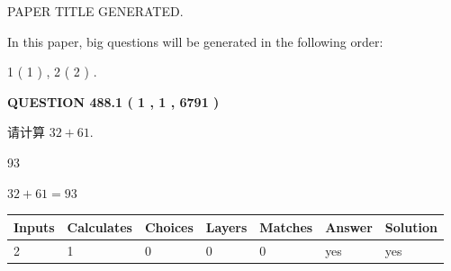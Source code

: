 \documentclass{ctexart}
\begin{document}
   
 \vspace{0.2in}
 
 
 
 
   
   
 PAPER TITLE GENERATED.
   
   
   
\vspace{0.2in}
   
In this paper, big questions will be generated in the following order: 
   
   
   1 ( 1 )
 ,
   2 ( 2 )
 .
  
\vspace{0.2in}
  
{\textbf{\Large{QUESTION
488.1 
 ( 1 , 1 , 6791 )
}}}
  
  
 
请计算 $ %
32 +  %
61 $.
 
 
 
\noindent{}
 
 

93
 
 
\noindent{}
 
 

 
 
 
\noindent{}
 
 

$ %
32 +  %
61=   %
93$
 
 
\noindent{}
 
 

 
   
   
   
   
\noindent\begin{tabular}{|l|l|l|l|l|l|l|}
 \hline
Inputs & Calculates & Choices & Layers & Matches & Answer & Solution \\ \hline
 2  & 
 1  & 
 0
  & 
 0  & 
 0  & 
  yes & 
  yes 
  \\ \hline
 \end{tabular}
   
   
   
   
\noindent{}
   
   
  
\end{document}
